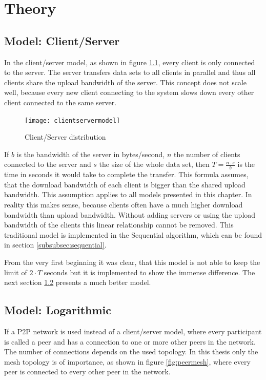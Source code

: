 \chapter{Theory}
\label{ch:theory}

\section{Model: Client/Server}
In the client/server model, as shown in figure \ref{fig:clientservermodel}, every client is only connected to the server. The server transfers data sets to all clients in parallel and thus all clients share the upload bandwidth of the server. This concept does not scale well, because every new client connecting to the system slows down every other client connected to the same server. 

\begin{figure}[H]
\centering
\texttt{[image: clientservermodel]}
\caption{Client/Server distribution}
\label{fig:clientservermodel}
\end{figure}

If $b$ is the bandwidth of the server in bytes/second, $n$ the number of clients connected to the server and $s$ the size of the whole data set, then $T=\frac{n \cdot s}{b}$ is the time in seconds it would take to complete the transfer. This formula assumes, that the download bandwidth of each client is bigger than the shared upload bandwidth. This assumption applies to all models presented in this chapter. In reality this makes sense, because clients often have a much higher download bandwidth than upload bandwidth. Without adding servers or using the upload bandwidth of the clients this linear relationship cannot be removed. This traditional model is implemented in the Sequential algorithm, which can be found in section \ref{subsubsec:sequential}.

From the very first beginning it was clear, that this model is not able to keep the limit of $2 \cdot T$ seconds but it is implemented to show the immense difference. The next section \ref{subsubsec:logarithmicmodel} presents a much better model.

\pagebreak
\section{Model: Logarithmic}
\label{subsubsec:logarithmicmodel}
If a P2P network is used instead of a client/server model, where every participant is called a peer and has a connection to one or more other peers in the network. The number of connections depends on the used topology. In this thesis only the mesh topology is of importance, as shown in figure \ref{fig:peermesh}, where every peer is connected to every other peer in the network.

